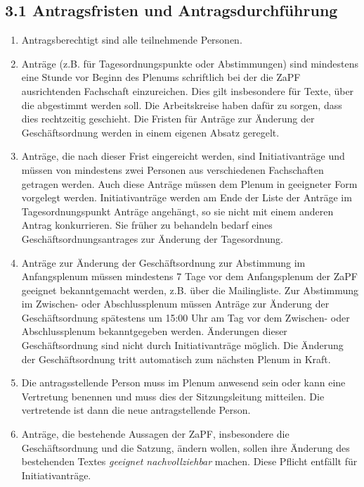 \documentclass[12pt,oneside]{scrartcl}
\begin{document}
\subsection{3.1 Antragsfristen und Antragsdurchführung%
  \label{antragsfristen-und-antragsdurchfuhrung}%
}

\begin{enumerate}
\item Antragsberechtigt sind alle teilnehmende Personen.

\item Anträge (z.B. für Tagesordnungspunkte oder Abstimmungen) sind mindestens
eine Stunde vor Beginn des Plenums schriftlich bei der die ZaPF
ausrichtenden Fachschaft einzureichen.
Dies gilt insbesondere für Texte, über die abgestimmt werden soll.
Die Arbeitskreise haben dafür zu sorgen, dass dies rechtzeitig geschieht.
Die Fristen für Anträge zur Änderung der Geschäftsordnung werden in einem
eigenen Absatz geregelt.

\item Anträge, die nach dieser Frist eingereicht werden, sind Initiativanträge
und müssen von mindestens zwei Personen aus verschiedenen Fachschaften
getragen werden.
Auch diese Anträge müssen dem Plenum in geeigneter Form vorgelegt werden.
Initiativanträge werden am Ende der Liste der Anträge im Tagesordnungspunkt
\textquotedbl{}Anträge\textquotedbl{} angehängt, so sie nicht mit einem anderen Antrag konkurrieren.
Sie früher zu behandeln bedarf eines Geschäftsordnungsantrages zur Änderung
der Tagesordnung.

\item Anträge zur Änderung der Geschäftsordnung zur Abstimmung im Anfangsplenum
müssen mindestens 7 Tage vor dem Anfangsplenum der ZaPF geeignet
bekanntgemacht werden, z.B. über die Mailingliste.
Zur Abstimmung im Zwischen- oder Abschlussplenum müssen Anträge zur Änderung
der Geschäftsordnung spätestens um 15:00 Uhr am Tag vor dem Zwischen- oder
Abschlussplenum bekanntgegeben werden.
Änderungen dieser Geschäftsordnung sind nicht durch Initiativanträge möglich.
Die Änderung der Geschäftsordnung tritt automatisch zum nächsten Plenum in Kraft.

\item Die antragsstellende Person muss im Plenum anwesend sein
oder kann eine Vertretung benennen und muss dies
der Sitzungsleitung mitteilen.
Die vertretende ist dann die neue antragstellende Person.

\item Anträge, die bestehende Aussagen der ZaPF, insbesondere die Geschäftsordnung
und die Satzung, ändern wollen, sollen ihre Änderung des bestehenden Textes
\emph{geeignet nachvollziehbar} machen.
Diese Pflicht entfällt für Initiativanträge.
\end{enumerate}
\end{document}
